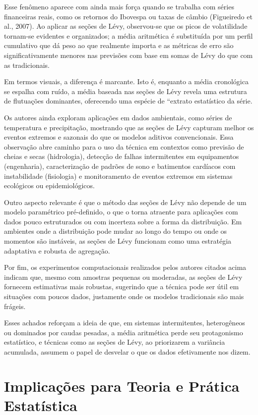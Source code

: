 \documentclass[
]{agujournal2019}
\begin{document}
Esse fenômeno aparece com ainda mais força quando se trabalha com séries
financeiras reais, como os retornos do Ibovespa ou taxas de câmbio
(Figueiredo et al., 2007). Ao aplicar as seções de Lévy, observou-se que
os picos de volatilidade tornam-se evidentes e organizados; a média
aritmética é substituída por um perfil cumulativo que dá peso ao que
realmente importa e as métricas de erro são significativamente menores
nas previsões com base em somas de Lévy do que com as tradicionais.

Em termos visuais, a diferença é marcante. Isto é, enquanto a média
cronológica se espalha com ruído, a média baseada nas seções de Lévy
revela uma estrutura de flutuações dominantes, oferecendo uma espécie de
``extrato estatístico da série.

Os autores ainda exploram aplicações em dados ambientais, como séries de
temperatura e precipitação, mostrando que as seções de Lévy capturam
melhor os eventos extremos e sazonais do que os modelos aditivos
convencionais. Essa observação abre caminho para o uso da técnica em
contextos como previsão de cheias e secas (hidrologia), detecção de
falhas intermitentes em equipamentos (engenharia), caracterização de
padrões de sono e batimentos cardíacos com instabilidade (fisiologia) e
monitoramento de eventos extremos em sistemas ecológicos ou
epidemiológicos.

Outro aspecto relevante é que o método das seções de Lévy não depende de
um modelo paramétrico pré-definido, o que o torna atraente para
aplicações com dados pouco estruturados ou com incerteza sobre a forma
da distribuição. Em ambientes onde a distribuição pode mudar ao longo do
tempo ou onde os momentos são instáveis, as seções de Lévy funcionam
como uma estratégia adaptativa e robusta de agregação.

Por fim, os experimentos computacionais realizados pelos autores citados
acima indicam que, mesmo com amostras pequenas ou moderadas, as seções
de Lévy fornecem estimativas mais robustas, sugerindo que a técnica pode
ser útil em situações com poucos dados, justamente onde os modelos
tradicionais são mais frágeis.

Esses achados reforçam a ideia de que, em sistemas intermitentes,
heterogêneos ou dominados por caudas pesadas, a média aritmética perde
seu protagonismo estatístico, e técnicas como as seções de Lévy, ao
priorizarem a variância acumulada, assumem o papel de desvelar o que os
dados efetivamente nos dizem.

\section{Implicações para Teoria e Prática
Estatística}\label{implicauxe7uxf5es-para-teoria-e-pruxe1tica-estatuxedstica}
\end{document}

